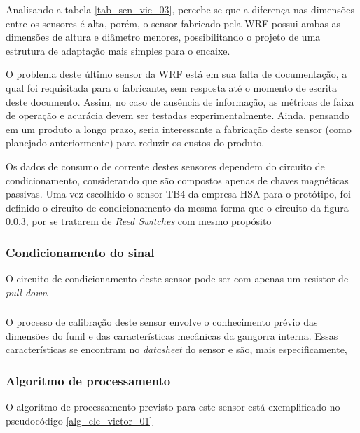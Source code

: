 		Analisando a tabela \ref{tab_sen_vic_03}, percebe-se que a diferença nas dimensões entre os sensores é alta, porém, o sensor fabricado pela WRF possui ambas as dimensões de altura e diâmetro menores, possibilitando o projeto de uma estrutura de adaptação mais simples para o encaixe.

		O problema deste último sensor da WRF está em sua falta de documentação, a qual foi requisitada para o fabricante, sem resposta até o momento de escrita deste documento. Assim, no caso de ausência de informação, as métricas de faixa de operação e acurácia devem ser testadas experimentalmente. Ainda, pensando em um produto a longo prazo, seria interessante a fabricação deste sensor (como planejado anteriormente) para reduzir os custos do produto.

		Os dados de consumo de corrente destes sensores dependem do circuito de condicionamento, considerando que são compostos apenas de chaves magnéticas passivas. Uma vez escolhido o sensor TB4 da empresa HSA para o protótipo, foi definido o circuito de condicionamento da mesma forma que o circuito da figura \ref{}, por se tratarem de \emph{Reed Switches} com mesmo propósito

		\subsubsection{Condicionamento do sinal}

		O circuito de condicionamento deste sensor pode ser com apenas um resistor de \emph{pull-down}

		\subsubsection{}

		O processo de calibração deste sensor envolve o conhecimento prévio das dimensões do funil e das características mecânicas da gangorra interna. Essas características se encontram no \emph{datasheet} do sensor e são, mais especificamente, 

		\subsubsection{Algoritmo de processamento}

		O algoritmo de processamento previsto para este sensor está exemplificado no pseudocódigo \ref{alg_ele_victor_01}

